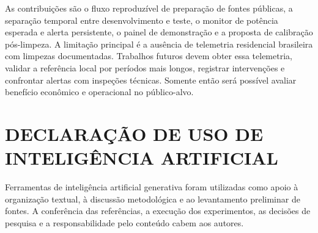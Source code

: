 \documentclass{UNESC}
\begin{document}
As contribuições são o fluxo reproduzível de preparação de fontes públicas, a separação temporal entre desenvolvimento e teste, o monitor de potência esperada e alerta persistente, o painel de demonstração e a proposta de calibração pós-limpeza. A limitação principal é a ausência de telemetria residencial brasileira com limpezas documentadas. Trabalhos futuros devem obter essa telemetria, validar a referência local por períodos mais longos, registrar intervenções e confrontar alertas com inspeções técnicas. Somente então será possível avaliar benefício econômico e operacional no público-alvo.

\section*{DECLARAÇÃO DE USO DE INTELIGÊNCIA ARTIFICIAL}
Ferramentas de inteligência artificial generativa foram utilizadas como apoio à organização textual, à discussão metodológica e ao levantamento preliminar de fontes. A conferência das referências, a execução dos experimentos, as decisões de pesquisa e a responsabilidade pelo conteúdo cabem aos autores.


\renewcommand{\refname}{REFERÊNCIAS}

\end{document}

